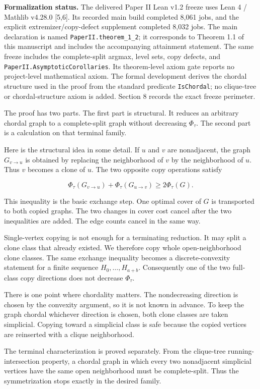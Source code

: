 \documentclass[
  american,
  11pt,
  a4paper,
]{article}
\begin{document}
\textbf{Formalization status.} The delivered Paper II Lean v1.2 freeze uses Lean 4 / Mathlib v4.28.0 {[}5,6{]}. Its recorded main build completed 8,061 jobs, and the explicit extremizer/copy-defect supplement completed 8,032 jobs. The main declaration is named \texttt{PaperII.theorem\_1\_2}; it corresponds to Theorem 1.1 of this manuscript and includes the accompanying attainment statement. The same freeze includes the complete-split argmax, level sets, copy defects, and \texttt{PaperII.AsymptoticCorollaries}. Its theorem-level axiom gate reports no project-level mathematical axiom. The formal development derives the chordal structure used in the proof from the standard predicate \texttt{IsChordal}; no clique-tree or chordal-structure axiom is added. Section 8 records the exact freeze perimeter.

The proof has two parts. The first part is structural. It reduces an arbitrary chordal graph to a complete-split graph without decreasing \(\Phi_\tau\). The second part is a calculation on that terminal family.

Here is the structural idea in some detail. If \(u\) and \(v\) are nonadjacent, the graph \(G_{v\to u}\) is obtained by replacing the neighborhood of \(v\) by the neighborhood of \(u\). Thus \(v\) becomes a clone of \(u\). The two opposite copy operations satisfy

\[
\Phi_\tau(G_{v\to u})
+
\Phi_\tau(G_{u\to v})
\ge
2\Phi_\tau(G).
\]

This inequality is the basic exchange step. One optimal cover of \(G\) is transported to both copied graphs. The two changes in cover cost cancel after the two inequalities are added. The edge counts cancel in the same way.

Single-vertex copying is not enough for a terminating reduction. It may split a clone class that already existed. We therefore copy whole open-neighborhood clone classes. The same exchange inequality becomes a discrete-convexity statement for a finite sequence \(H_0,\ldots,H_{a+b}\). Consequently one of the two full-class copy directions does not decrease \(\Phi_\tau\).

There is one point where chordality matters. The nondecreasing direction is chosen by the convexity argument, so it is not known in advance. To keep the graph chordal whichever direction is chosen, both clone classes are taken simplicial. Copying toward a simplicial class is safe because the copied vertices are reinserted with a clique neighborhood.

The terminal characterization is proved separately. From the clique-tree running-intersection property, a chordal graph in which every two nonadjacent simplicial vertices have the same open neighborhood must be complete-split. Thus the symmetrization stops exactly in the desired family.
\end{document}

